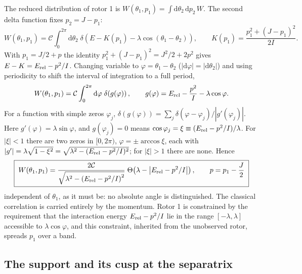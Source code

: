 \documentclass[preprint,12pt]{elsarticle}
\newcommand{\dd}{\mathrm{d}}
\newcommand{\Erel}{E_{\rm rel}}
\begin{document}
The reduced distribution of rotor 1 is
$W(\theta_{1},p_{1})=\int\dd\theta_{2}\,\dd p_{2}\,W$. The second delta
function fixes $p_{2}=J-p_{1}$:
\begin{equation}
W(\theta_{1},p_{1})=\mathcal{C}\int_{0}^{2\pi}\dd\theta_{2}\;
\delta\!\left(E-K(p_{1})-\lambda\cos(\theta_{1}-\theta_{2})\right),\qquad
K(p_{1})=\frac{p_{1}^{2}+(J-p_{1})^{2}}{2I}.
\end{equation}
With $p_{1}=J/2+p$ the identity $p_{1}^{2}+(J-p_{1})^{2}=J^{2}/2+2p^{2}$ gives
$E-K=\Erel-p^{2}/I$. Changing variable to $\varphi=\theta_{1}-\theta_{2}$
($|\dd\varphi|=|\dd\theta_{2}|$) and using periodicity to shift the interval of
integration to a full period,
\begin{equation}
W(\theta_{1},p_{1})=\mathcal{C}\int_{0}^{2\pi}\dd\varphi\;
\delta\!\left(g(\varphi)\right),\qquad
g(\varphi)=\Erel-\frac{p^{2}}{I}-\lambda\cos\varphi .
\end{equation}
For a function with simple zeros $\varphi_{j}$,
$\delta(g(\varphi))=\sum_{j}\delta(\varphi-\varphi_{j})/|g'(\varphi_{j})|$. Here
$g'(\varphi)=\lambda\sin\varphi$, and $g(\varphi_{j})=0$ means
$\cos\varphi_{j}=\xi\equiv(\Erel-p^{2}/I)/\lambda$. For $|\xi|<1$ there are two
zeros in $[0,2\pi)$, $\varphi=\pm\arccos\xi$, each with
$|g'|=\lambda\sqrt{1-\xi^{2}}=\sqrt{\lambda^{2}-(\Erel-p^{2}/I)^{2}}$; for
$|\xi|>1$ there are none. Hence
\begin{equation}
\boxed{\;
W(\theta_{1},p_{1})=\frac{2\mathcal{C}}
{\sqrt{\lambda^{2}-\left(\Erel-p^{2}/I\right)^{2}}}\;
\Theta\!\left(\lambda-\left|\Erel-p^{2}/I\right|\right),\qquad p=p_{1}-\frac{J}{2}\;}
\label{eq:Wclass}
\end{equation}
independent of $\theta_{1}$, as it must be: no absolute angle is distinguished.
The classical correlation is carried entirely by the momentum. Rotor 1 is
constrained by the requirement that the interaction energy $\Erel-p^{2}/I$ lie
in the range $[-\lambda,\lambda]$ accessible to $\lambda\cos\varphi$, and this
constraint, inherited from the unobserved rotor, spreads $p_{1}$ over a band.

\subsection{The support and its cusp at the separatrix}
\end{document}

